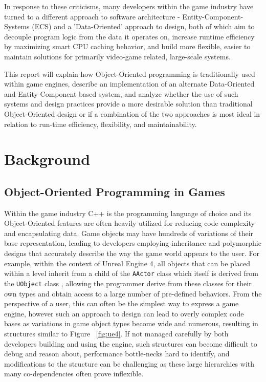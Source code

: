\documentclass[10pt]{scrartcl}
\begin{document}
	In response to these criticisms, many developers within the game industry have turned to a different approach to software architecture - Entity-Component-Systems (ECS) and a 'Data-Oriented' approach to design, both of which aim to decouple program logic from the data it operates on, increase runtime efficiency by maximizing smart CPU caching behavior, and build more flexible, easier to maintain solutions for primarily video-game related, large-scale systems.
	
	This report will explain how Object-Oriented programming is traditionally used within game engines, describe an implementation of an alternate Data-Oriented and Entity-Component based system, and analyze whether the use of such systems and design practices provide a more desirable solution than traditional Object-Oriented design or if a combination of the two approaches is most ideal in relation to run-time efficiency, flexibility, and maintainability.

	\section{Background} %
	\label{sec:background}
	

	\subsection{Object-Oriented Programming in Games} %
	\label{sec:object_oriented_programming_in_games}
	Within the game industry C++ is the programming language of choice \parencite[4]{gregory-cpp-usage} and its Object-Oriented features are often heavily utilized for reducing code complexity and encapsulating data. Game objects may have hundreds of variations of their base representation, leading to developers employing inheritance and polymorphic designs that accurately describe the way the game world appears to the user. For example, within the context of Unreal Engine 4, all objects that can be placed within a level inherit from a child of the \texttt{AActor} class which itself is derived from the \texttt{UObject} class \parencite{unreal-docs}, allowing the programmer derive from these classes for their own types and obtain access to a large number of pre-defined behaviors. From the perspective of a user, this can often be the simplest way to express a game engine, however such an approach to design can lead to overly complex code bases as variations in game object types become wide and numerous, resulting in structures similar to Figure ~\ref{fig:ue4}. 
	If not managed carefully by both developers building and using the engine, such structures can become difficult to debug and reason about, performance bottle-necks hard to identify, and modifications to the structure can be challenging as these large hierarchies with many co-dependencies often prove inflexible. 
\end{document}
